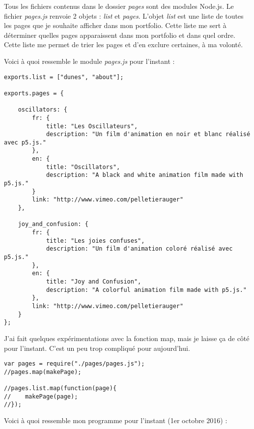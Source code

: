 Tous les fichiers contenus dans le dossier \textit{pages} sont des modules Node.js. Le fichier \textit{pages.js} renvoie 2 objets : \textit{list} et \textit{pages}. L'objet \textit{list} est une liste de toutes les pages que je souhaite afficher dans mon portfolio. Cette liste me sert à déterminer quelles pages apparaissent dans mon portfolio et dans quel ordre. Cette liste me permet de trier les pages et d'en exclure certaines, à ma volonté.

Voici à quoi ressemble le module \textit{pages.js} pour l'instant :

\begin{lstlisting}
exports.list = ["dunes", "about"];

exports.pages = {

    oscillators: {
        fr: {
            title: "Les Oscillateurs",
            description: "Un film d'animation en noir et blanc réalisé avec p5.js."
        },
        en: {
            title: "Oscillators",
            description: "A black and white animation film made with p5.js."
        }
        link: "http://www.vimeo.com/pelletierauger"
    },

    joy_and_confusion: {
        fr: {
            title: "Les joies confuses",
            description: "Un film d'animation coloré réalisé avec p5.js."
        },
        en: {
            title: "Joy and Confusion",
            description: "A colorful animation film made with p5.js."
        },
        link: "http://www.vimeo.com/pelletierauger"
    }
};
\end{lstlisting}

\clearpage

J'ai fait quelques expérimentations avec la fonction map, mais je laisse ça de côté pour l'instant. C'est un peu trop compliqué pour aujourd'hui.

\begin{lstlisting}
var pages = require("./pages/pages.js");
//pages.map(makePage);

//pages.list.map(function(page){
//    makePage(page);
//});
\end{lstlisting}

Voici à quoi ressemble mon programme pour l'instant (1er octobre 2016) : 

